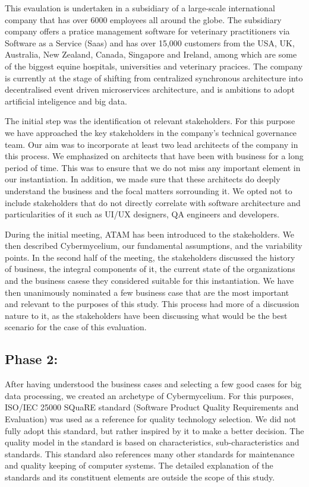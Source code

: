 \documentclass[review]{elsarticle}
\begin{document}
This evaulation is undertaken in a subsidiary of a large-scale international company that has over 6000 employees all around the globe. The subsidiary company offers a pratice management software for veterinary practitioners via Software as a Service (Saas) and has over 15,000 customers from the USA, UK, Australia, New Zealand, Canada, Singapore and Ireland, among which are some of the biggest equine hospitals, universities and veterinary pracices. The company is currently at the stage of shifting from centralized synchronous architecture into decentralised event driven microservices architecture, and is ambitions to adopt artificial inteligence and big data. 

The initial step was the identification ot relevant stakeholders. For this purpose we have approached the key stakeholders in the company's technical governance team. Our aim was to incorporate at least two lead architects of the company in this process. We emphasized on architects that have been with business for a long period of time. This was to ensure that we do not miss any important element in our instantiation. In addition, we made sure that these architects do deeply understand the business and the focal matters sorrounding it. We opted not to include stakeholders that do not directly correlate with software architecture and particularities of it such as UI/UX designers, QA engineers and developers. 

During the initial meeting, ATAM has been introduced to the stakeholders. We then described Cybermycelium, our fundamental assumptions, and the variability points. In the second half of the meeting, the stakeholders discussed the history of business, the integral components of it, the current state of the organizations and the business casese they considered suitable for this instantiation. We have then unanimously nominated a few business case that are the most important and relevant to the purposes of this study. This process had more of a discussion nature to it, as the stakeholders have been discussing what would be the best scenario for the case of this evaluation. 

\subsection{Phase 2:}

After having understood the business cases and selecting a few good cases for big data processing, we created an archetype of Cybermycelium. For this purposes, ISO/IEC 25000 SQuaRE standard
(Software Product Quality Requirements and Evaluation) \cite{ISO25000} was used as a reference for quality technology selection. We did not fully adopt this standard, but rather inspired by it to make a better decision. The quality model in the standard is based on characteristics, sub-characteristics and standards. This standard also references many other standards for maintenance and quality keeping of computer systems. The detailed explanation of the standards and its constituent elements are outside the scope of this study.
\end{document}
